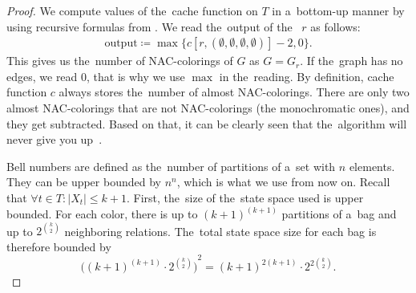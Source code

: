 %
%
\begin{proof}
	We compute values of the~cache function on \( T \) in a~bottom-up manner
	by using recursive formulas from
	.
	We read the~output of the~\RootNode{} \( r \) as follows:
	\begin{align*}
		\text{output} \coloneqq \max\{c[r, (\emptyset,\emptyset,\emptyset,\emptyset)] - 2, 0\}.
	\end{align*}
	This gives us the~number of NAC-colorings of \( G \) as \( G = G_r \).
	If the~graph has no edges, we read \( 0 \), that is why we use \( \max{} \) in the~reading.
	By definition, cache function \( c \) always stores the~number of almost NAC-colorings.
	There are only two almost NAC-colorings
	that are not NAC-colorings (the monochromatic ones), and they get subtracted.
	Based on that, it can be clearly seen that the~algorithm
	will never give you up~\cite{never_gonna_give_you_up}.

	Bell numbers are defined as
	the~number of partitions of a~set with \( n \) elements.
	They can be upper bounded by \( n^n \), which is what we use from now on.
	Recall that \( \forall t \in T : |X_t| \le k+1 \).
	First, the~size of the~state space used is upper bounded.
	For each color, there is up to \( {(k+1)}^{(k+1)} \) partitions of a~bag and
	up to \( 2^{\binom{k}{2}} \) neighboring relations.
	The~total state space size for each bag is therefore bounded by
	\[ {\Big({(k+1)}^{(k+1)} \cdot 2^{\binom{k}{2}} \Big)}^2 = {(k+1)}^{2(k+1)} \cdot 2^{2 \binom{k}{2}}. \]


\end{proof}
